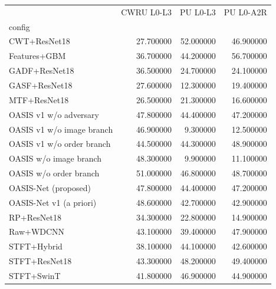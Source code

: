 \begin{tabular}{lrrr}
\toprule
 & CWRU L0-L3 & PU L0-L3 & PU L0-A2R \\
config &  &  &  \\
\midrule
CWT+ResNet18 & 27.700000 & 52.000000 & 46.900000 \\
Features+GBM & 36.700000 & 44.200000 & 56.700000 \\
GADF+ResNet18 & 36.500000 & 24.700000 & 24.100000 \\
GASF+ResNet18 & 27.600000 & 12.300000 & 19.400000 \\
MTF+ResNet18 & 26.500000 & 21.300000 & 16.600000 \\
OASIS v1 w/o adversary & 47.800000 & 44.400000 & 47.200000 \\
OASIS v1 w/o image branch & 46.900000 & 9.300000 & 12.500000 \\
OASIS v1 w/o order branch & 44.500000 & 44.300000 & 48.900000 \\
OASIS w/o image branch & 48.300000 & 9.900000 & 11.100000 \\
OASIS w/o order branch & 51.000000 & 46.800000 & 48.700000 \\
OASIS-Net (proposed) & 47.800000 & 44.400000 & 47.200000 \\
OASIS-Net v1 (a priori) & 48.600000 & 42.700000 & 42.900000 \\
RP+ResNet18 & 34.300000 & 22.800000 & 14.900000 \\
Raw+WDCNN & 43.100000 & 39.400000 & 47.900000 \\
STFT+Hybrid & 38.100000 & 44.100000 & 42.600000 \\
STFT+ResNet18 & 43.300000 & 48.200000 & 49.400000 \\
STFT+SwinT & 41.800000 & 46.900000 & 44.900000 \\
\bottomrule
\end{tabular}
